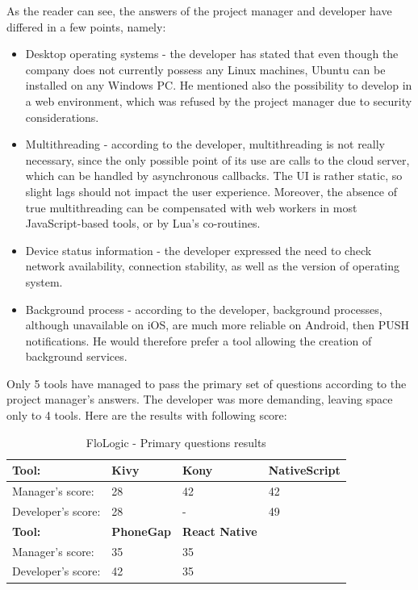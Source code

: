 \documentclass[english,master,public,dept460,male,cpdeclaration,oneside]{diploma}
\begin{document}
As the reader can see, the answers of the project manager and developer have differed in a few points, namely:
\begin{itemize}
	\item Desktop operating systems - the developer has stated that even though the company does not currently possess any Linux machines, Ubuntu can be installed on any Windows PC. He mentioned also the possibility to develop in a web environment, which was refused by the project manager due to security considerations.
	\item Multithreading - according to the developer, multithreading is not really necessary, since the only possible point of its use are calls to the cloud server, which can be handled by asynchronous callbacks. The UI is rather static, so slight lags should not impact the user experience. Moreover, the absence of true multithreading can be compensated with web workers in most JavaScript-based tools, or by Lua’s co-routines.
	\item Device status information - the developer expressed the need to check network availability, connection stability, as well as the version of operating system.
	\item Background process - according to the developer, background processes, although unavailable on iOS, are much more reliable on Android, then PUSH notifications. He would therefore prefer a tool allowing the creation of background services.
\end{itemize}

Only 5 tools have managed to pass the primary set of questions according to the project manager’s answers. The developer was more demanding, leaving space only to 4 tools. Here are the results with following score:

\begin{table}[!h]
	\centering
	\caption{FloLogic - Primary questions results}
	\begin{tabular}{p{4cm} | p{3cm} | p{3cm} | p{3cm}}
		\toprule		
		\textbf{Tool:} & \textbf{Kivy} & \textbf{Kony} & \textbf{NativeScript} \\
		\midrule
		Manager’s score: & 28 & 42 & 42 \\
		Developer’s score: & 28 & - & 49 \\ 
		\midrule
		\textbf{Tool:} & \textbf{PhoneGap} & \textbf{React Native} & \\
		\midrule
		Manager’s score: & 35 & 35 & \\
		Developer’s score: & 42 & 35 & \\			
		\midrule
	\end{tabular}
\end{table}
\end{document}
